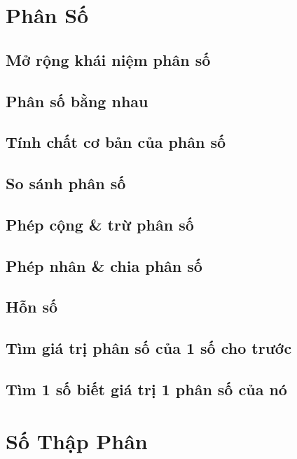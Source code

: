 \documentclass{article}
\numberwithin{equation}{section}
\begin{document}
\newpage
\section{Phân Số}

\subsection{Mở rộng khái niệm phân số}

\subsection{Phân số bằng nhau}

\subsection{Tính chất cơ bản của phân số}

\subsection{So sánh phân số}

\subsection{Phép cộng \& trừ phân số}

\subsection{Phép nhân \& chia phân số}

\subsection{Hỗn số}

\subsection{Tìm giá trị phân số của 1 số cho trước}

\subsection{Tìm 1 số biết giá trị 1 phân số của nó}


\section{Số Thập Phân}
\end{document}
